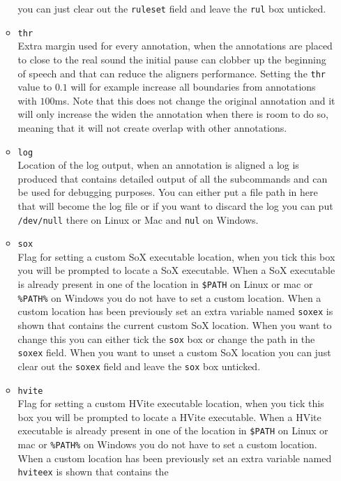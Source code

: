\documentclass[twoside,a4paper]{book}
\begin{document}
\begin{itemize}
\begin{itemize}
				you can just clear out the \texttt{ruleset} field and leave the
				\texttt{rul} box unticked.
			\item \texttt{thr}\\
				Extra margin used for every annotation, when the annotations are placed
				to close to the real sound the initial pause can clobber up the
				beginning of speech and that can reduce the aligners performance.
				Setting the \texttt{thr} value to $0.1$ will for example increase all
				boundaries from annotations with $100$ms. Note that this does not
				change the original annotation and it will only increase the widen the
				annotation when there is room to do so, meaning that it will not create
				overlap with other annotations.
			\item \texttt{log}\\
				Location of the log output, when an annotation is aligned a log is
				produced that contains detailed output of all the subcommands and can
				be used for debugging purposes. You can either put a file path in here
				that will become the log file or if you want to discard the log you can
				put \texttt{/dev/null} there on Linux or Mac and \texttt{nul} on
				Windows.
			\item \texttt{sox}\\
				Flag for setting a custom SoX executable location, when you tick this
				box you will be prompted to locate a SoX executable. When a SoX
				executable is already present in one of the location in \texttt{\$PATH}
				on Linux or mac or \texttt{\%PATH\%} on Windows you do not have to set
				a custom location. When a custom location has been previously set an
				extra variable named \texttt{soxex} is shown that contains the current
				custom SoX location.  When you want to change this you can either tick
				the \texttt{sox} box or change the path in the \texttt{soxex} field.
				When you want to unset a custom SoX location you can just clear out the
				\texttt{soxex} field and leave the \texttt{sox} box unticked.
			\item \texttt{hvite}\\
				Flag for setting a custom HVite executable location, when you tick this
				box you will be prompted to locate a HVite executable. When a HVite
				executable is already present in one of the location in \texttt{\$PATH}
				on Linux or mac or \texttt{\%PATH\%} on Windows you do not have to set
				a custom location. When a custom location has been previously set an
				extra variable named \texttt{hviteex} is shown that contains the

\end{itemize}
\end{itemize}
\end{document}
